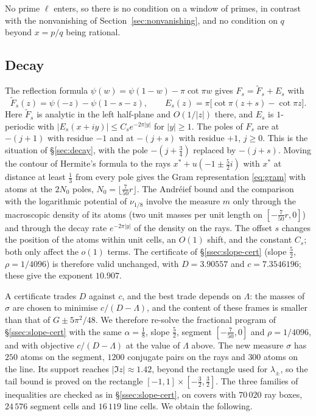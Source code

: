 No prime $\ell$ enters, so there is no condition on a window of primes, in contrast with the nonvanishing of
Section~\ref{sec:nonvanishing}, and no condition on $q$ beyond $x=p/q$ being rational.

\subsection{Decay}
The reflection formula $\psi(w)=\psi(1-w)-\pi\cot\pi w$ gives $F_s=\tilde F_s+E_s$ with
\[
 \tilde F_s(z)=\psi(-z)-\psi(1-s-z),\qquad E_s(z)=\pi\bigl[\cot\pi(z+s)-\cot\pi z\bigr].
\]
Here $\tilde F_s$ is analytic in the left half-plane and $O(1/|z|)$ there, and $E_s$ is $1$-periodic with
$|E_s(x+iy)|\le C_se^{-2\pi|y|}$ for $|y|\ge1$. The poles of $F_s$ are at $-(j+1)$ with residue $-1$ and at $-(j+s)$ with residue $+1$, $j\ge0$. This is
the situation of \S\ref{sec:decay}, with the pole $-(j+\frac34)$ replaced by $-(j+s)$. Moving the contour of Hermite's formula to the rays
$x^*+u(-1\pm\frac52i)$ with $x^*$ at distance at least $\frac13$ from every pole gives the Gram representation \eqref{eq:gram} with atoms at
the $2N_0$ poles, $N_0=\lfloor\frac7{50}r\rfloor$. The Andr\'eief bound and the comparison with the logarithmic potential of
$\nu_{1/8}$ involve the measure $m$ only through the macroscopic density of its atoms (two unit masses per unit length on $[-\frac7{50}r,0]$) and through the
decay rate $e^{-2\pi|y|}$ of the density on the rays. The offset $s$ changes the position of the atoms within unit
cells, an $O(1)$ shift, and the constant $C_s$; both only affect the $o(1)$ terms. The certificate of \S\ref{ssec:slope-cert} (slope $\frac52$, $\rho=1/4096$) is therefore valid unchanged,
with $D=3.90557$ and $c=7.3546196$; these give the exponent $10.907$.

A certificate trades $D$ against $c$, and the best trade depends on $\Lambda$: the masses of $\sigma$ are chosen to minimise $c/(D-\Lambda)$, and the content
of these frames is smaller than that of $G\pm5\pi^2/48$. We therefore re-solve the fractional program of \S\ref{ssec:slope-cert} with the same
$\alpha=\frac18$, slope $\frac52$, segment $[-\frac7{50},0]$ and $\rho=1/4096$, and with objective $c/(D-\Lambda)$ at the value of $\Lambda$ above. The new
measure $\sigma$ has $250$ atoms on the segment, $1200$ conjugate pairs on the rays and $300$ atoms on the line. Its support reaches $|\Im z|\approx1.42$, beyond the
rectangle used for $\lambda_\pm$, so the tail bound is proved on the rectangle $[-1,1]\times[-\frac32,\frac32]$. The three families of inequalities are checked as in
\S\ref{ssec:slope-cert}, on covers with $70\,020$ ray boxes, $24\,576$ segment cells and $16\,119$ line cells. We obtain the following.

